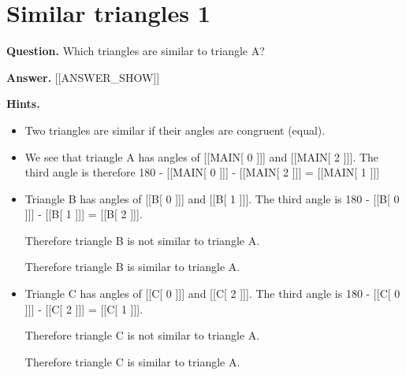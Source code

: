 \documentclass{article}
\begin{document}
\section*{Similar triangles 1}
\textbf{Question.} Which triangles are similar to triangle A?

\textbf{Answer.} [[ANSWER\_SHOW]]

\textbf{Hints.}
\begin{itemize}
  \item Two triangles are similar if their angles are congruent (equal).
  \item We see that triangle A has angles of [[MAIN[ 0 ]]] and [[MAIN[ 2 ]]]. The third angle is therefore 180 - [[MAIN[ 0 ]]] - [[MAIN[ 2 ]]] = [[MAIN[ 1 ]]]
  \item Triangle B has angles of [[B[ 0 ]]] and [[B[ 1 ]]]. The third angle is 180 - [[B[ 0 ]]] -  [[B[ 1 ]]] = [[B[ 2 ]]].
                    
                        Therefore triangle B is not similar to triangle A.
                    
                        Therefore triangle B is similar to triangle A.
  \item Triangle C has angles of [[C[ 0 ]]] and [[C[ 2 ]]]. The third angle is 180 - [[C[ 0 ]]] -  [[C[ 2 ]]] = [[C[ 1 ]]].
                    
                        Therefore triangle C is not similar to triangle A.
                    
                        Therefore triangle C is similar to triangle A.
\end{itemize}
\end{document}
